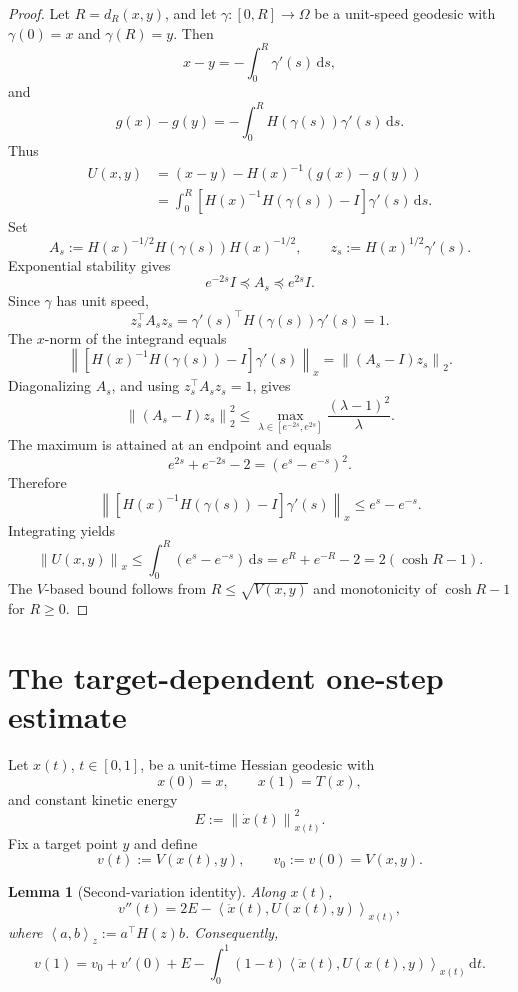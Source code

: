 \documentclass[11pt]{article}
\newtheorem{lemma}{Lemma}
\newcommand{\ip}[2]{\left\langle #1,#2\right\rangle}
\newcommand{\norm}[1]{\left\lVert #1\right\rVert}
\newcommand{\dd}{\mathrm d}
\begin{document}
\begin{proof}
Let $R=d_R(x,y)$, and let $\gamma:[0,R]\to\Omega$ be a unit-speed geodesic with
$\gamma(0)=x$ and $\gamma(R)=y$. Then
\[
    x-y=-\int_0^R \gamma'(s)\,\dd s,
\]
and
\[
    g(x)-g(y)=-\int_0^R H(\gamma(s))\gamma'(s)\,\dd s.
\]
Thus
\[
\begin{aligned}
    U(x,y)
    &=(x-y)-H(x)^{-1}(g(x)-g(y)) \\
    &=
    \int_0^R
    \left[H(x)^{-1}H(\gamma(s))-I\right]\gamma'(s)\,\dd s.
\end{aligned}
\]
Set
\[
    A_s:=H(x)^{-1/2}H(\gamma(s))H(x)^{-1/2},
    \qquad
    z_s:=H(x)^{1/2}\gamma'(s).
\]
Exponential stability gives
\[
    e^{-2s}I\preceq A_s\preceq e^{2s}I.
\]
Since $\gamma$ has unit speed,
\[
    z_s^\top A_s z_s
    =
    \gamma'(s)^\top H(\gamma(s))\gamma'(s)
    =1.
\]
The $x$-norm of the integrand equals
\[
    \left\|
    \left[H(x)^{-1}H(\gamma(s))-I\right]\gamma'(s)
    \right\|_x
    =
    \norm{(A_s-I)z_s}_2.
\]
Diagonalizing $A_s$, and using $z_s^\top A_s z_s=1$, gives
\[
    \norm{(A_s-I)z_s}_2^2
    \le
    \max_{\lambda\in[e^{-2s},e^{2s}]}
    \frac{(\lambda-1)^2}{\lambda}.
\]
The maximum is attained at an endpoint and equals
\[
    e^{2s}+e^{-2s}-2
    =
    (e^s-e^{-s})^2.
\]
Therefore
\[
    \left\|
    \left[H(x)^{-1}H(\gamma(s))-I\right]\gamma'(s)
    \right\|_x
    \le
    e^s-e^{-s}.
\]
Integrating yields
\[
    \norm{U(x,y)}_x
    \le
    \int_0^R (e^s-e^{-s})\,\dd s
    =
    e^R+e^{-R}-2
    =
    2(\cosh R-1).
\]
The $V$-based bound follows from $R\le\sqrt{V(x,y)}$ and monotonicity of $\cosh R-1$ for $R\ge0$.
\end{proof}

\section{The target-dependent one-step estimate}

Let $x(t)$, $t\in[0,1]$, be a unit-time Hessian geodesic with
\[
    x(0)=x,
    \qquad
    x(1)=T(x),
\]
and constant kinetic energy
\[
    E:=\norm{\dot x(t)}_{x(t)}^2.
\]
Fix a target point $y$ and define
\[
    v(t):=V(x(t),y),
    \qquad
    v_0:=v(0)=V(x,y).
\]

\begin{lemma}[Second-variation identity]
\label{lem:secondvariation}
Along $x(t)$,
\[
    v''(t)=2E-\ip{\ddot x(t)}{U(x(t),y)}_{x(t)},
\]
where $\ip{a}{b}_z:=a^\top H(z)b$.
Consequently,
\[
    v(1)
    =
    v_0+v'(0)+E
    -
    \int_0^1(1-t)\ip{\ddot x(t)}{U(x(t),y)}_{x(t)}\,\dd t.
\]
\end{lemma}
\end{document}
